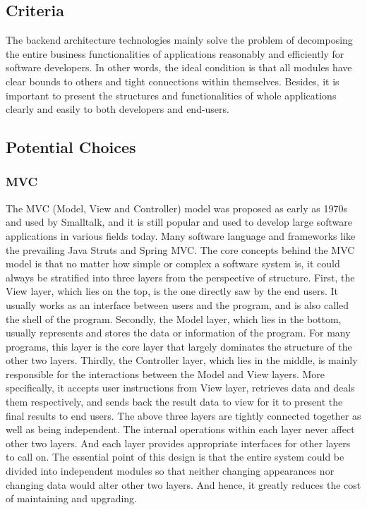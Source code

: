 \documentclass[letterpaper,10pt]{article}
\begin{document}
	\subsection{Criteria}
  The backend architecture technologies mainly solve the problem of decomposing the entire business functionalities of applications reasonably and efficiently for software developers. In other words, the ideal condition is that all modules have clear bounds to others and tight connections within themselves. Besides, it is important to present the structures and functionalities of whole applications clearly and easily to both developers and end-users.

	\subsection{Potential Choices}
		\subsubsection{MVC}
        The MVC (Model, View and Controller) model was proposed as early as 1970s and used by Smalltalk, and it is still popular and used to develop large software applications in various fields today. Many software language and frameworks like the prevailing Java Struts and Spring MVC. The core concepts behind the MVC model is that no matter how simple or complex a software system is, it could always be stratified into three layers from the perspective of structure. First, the View layer, which lies on the top, is the one directly saw by the end users. It usually works as an interface between users and the program, and is also called the shell of the program. Secondly, the Model layer, which lies in the bottom, usually represents and stores the data or information of the program. For many programs, this layer is the core layer that largely dominates the structure of the other two layers. Thirdly, the Controller layer, which lies in the middle, is mainly responsible for the interactions between the Model and View layers. More specifically, it accepts user instructions from View layer, retrieves data and deals them respectively, and sends back the result data to view for it to present the final results to end users. The above three layers are tightly connected together as well as being independent. The internal operations within each layer never affect other two layers. And each layer provides appropriate interfaces for other layers to call on. The essential point of this design is that the entire system could be divided into independent modules so that neither changing appearances nor changing data would alter other two layers. And hence, it greatly reduces the cost of maintaining and upgrading.
\end{document}
